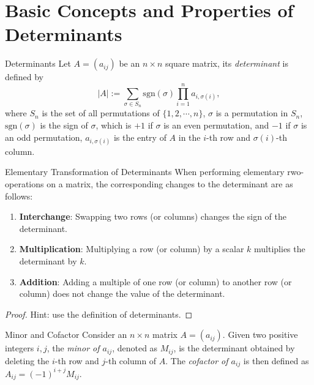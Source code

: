 
\section{Basic Concepts and Properties of Determinants}

\begin{definition}{Determinants}{}
  Let $A = (a_{ij})$ be an $n \times n$ square matrix,
  its \emph{determinant} is defined by
  \begin{equation}
    |A| := \sum\limits_{\sigma \in S_n} \mathrm{sgn}(\sigma) \prod\limits_{i = 1}^n a_{i, \sigma(i)},
  \end{equation}
  where $S_n$ is the set of all permutations of $\{1, 2, \cdots, n\}$,
  $\sigma$ is a permutation in $S_n$,
  $\mathrm{sgn}(\sigma)$ is the sign of $\sigma$,
  which is $+1$ if $\sigma$ is an even permutation,
  and $-1$ if $\sigma$ is an odd permutation,
  $a_{i, \sigma(i)}$ is the entry of $A$ in the $i$-th row and $\sigma(i)$-th column.
\end{definition}

\begin{proposition}{Elementary Transformation of Determinants}{}
  When performing elementary rwo-operations on a matrix,
  the corresponding changes to the determinant are as follows:
  \begin{enumerate}
  \item \textbf{Interchange}: Swapping two rows (or columns) changes the sign of
    the determinant.
  \item \textbf{Multiplication}: Multiplying a row (or column) by a scalar $k$
    multiplies the determinant by $k$.
  \item \textbf{Addition}: Adding a multiple of one row (or column) to another
    row (or column) does not change the value of the determinant.
  \end{enumerate}
\end{proposition}

\begin{proof}
  Hint: use the definition of determinants.
\end{proof}

\begin{definition}{Minor and Cofactor}{}
  Consider an $n \times n$ matrix $A = (a_{ij})$.
  Given two positive integers $i,j$,
  the \emph{minor of $a_{ij}$}, denoted as $M_{ij}$,
  is the determinant obtained by deleting the $i$-th row
  and $j$-th column of $A$.
  The \emph{cofactor of $a_{ij}$} is then defined as $A_{ij} = (-1)^{i+j}M_{ij}$.
\end{definition}

